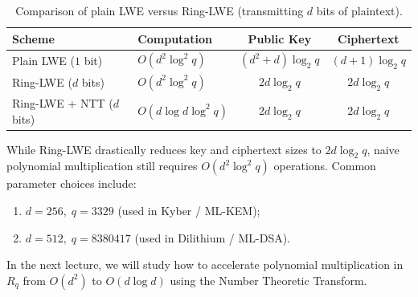 \begin{table}[htbp]
    \centering
    \small
    \setlength{\tabcolsep}{4pt}
    \begin{tabular}{@{}llcc@{}}
        \toprule
        \textbf{Scheme} & \textbf{Computation} & \textbf{Public Key} & \textbf{Ciphertext} \\
        \midrule
        Plain LWE (\(1\) bit)     & \(O(d^2 \log^2 q)\)        & \((d^2 + d) \log_2 q\) & \((d + 1) \log_2 q\) \\
        Ring-LWE (\(d\) bits)     & \(O(d^2 \log^2 q)\)        & \(2d \log_2 q\)       & \(2d \log_2 q\) \\
        Ring-LWE + NTT (\(d\) bits) & \(O(d \log d \log^2 q)\) & \(2d \log_2 q\)       & \(2d \log_2 q\) \\
        \bottomrule
    \end{tabular}
    \caption{Comparison of plain LWE versus Ring-LWE (transmitting \(d\) bits of plaintext).}
    \label{tab:ring-lwe-comparison}
\end{table}

While Ring-LWE drastically reduces key and ciphertext sizes to \(2d \log_2 q\), naive polynomial multiplication still requires \(O(d^2 \log^2 q)\) operations.
Common parameter choices include:
\begin{enumerate}
    \item \(d = 256, \; q = 3329\) (used in Kyber / ML-KEM);
    \item \(d = 512, \; q = 8380417\) (used in Dilithium / ML-DSA).
\end{enumerate}
In the next lecture, we will study how to accelerate polynomial multiplication in \(R_q\) from \(O(d^2)\) to \(O(d \log d)\) using the Number Theoretic Transform.
